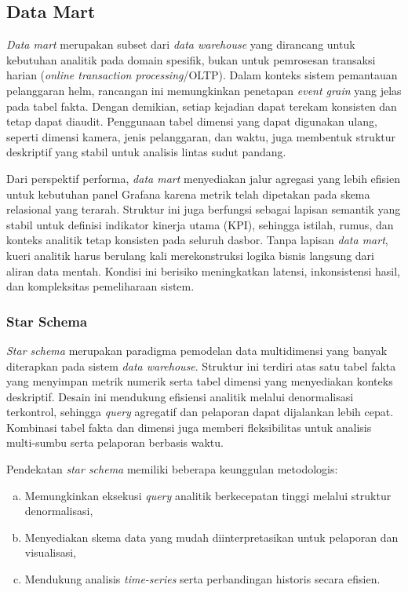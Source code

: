 \subsection{Data Mart}

\textit{Data mart} merupakan subset dari \textit{data warehouse} yang
dirancang untuk kebutuhan analitik pada domain spesifik, bukan untuk
pemrosesan transaksi harian (\textit{online transaction processing}/OLTP).
Dalam konteks sistem pemantauan pelanggaran helm, rancangan ini memungkinkan
penetapan \textit{event grain} yang jelas pada tabel fakta. Dengan demikian,
setiap kejadian dapat terekam konsisten dan tetap dapat diaudit. Penggunaan
tabel dimensi yang dapat digunakan ulang, seperti dimensi kamera, jenis
pelanggaran, dan waktu, juga membentuk struktur deskriptif yang stabil untuk
analisis lintas sudut pandang.

Dari perspektif performa, \textit{data mart} menyediakan jalur agregasi yang
lebih efisien untuk kebutuhan panel Grafana karena metrik telah dipetakan pada
skema relasional yang terarah. Struktur ini juga berfungsi sebagai lapisan
semantik yang stabil untuk definisi indikator kinerja utama (KPI), sehingga
istilah, rumus, dan konteks analitik tetap konsisten pada seluruh dasbor.
Tanpa lapisan \textit{data mart}, kueri analitik harus berulang kali
merekonstruksi logika bisnis langsung dari aliran data mentah. Kondisi ini
berisiko meningkatkan latensi, inkonsistensi hasil, dan kompleksitas
pemeliharaan sistem.

\subsubsection{Star Schema}

\textit{Star schema} merupakan paradigma pemodelan data multidimensi yang
banyak diterapkan pada sistem \textit{data warehouse}. Struktur ini terdiri
atas satu tabel fakta yang menyimpan metrik numerik serta tabel dimensi yang
menyediakan konteks deskriptif. Desain ini mendukung efisiensi analitik
melalui denormalisasi terkontrol, sehingga \textit{query} agregatif dan
pelaporan dapat dijalankan lebih cepat. Kombinasi tabel fakta dan dimensi juga
memberi fleksibilitas untuk analisis multi-sumbu serta pelaporan berbasis
waktu.

Pendekatan \textit{star schema} memiliki beberapa keunggulan metodologis:
\begin{enumerate}[a.]
\item Memungkinkan eksekusi \textit{query} analitik berkecepatan tinggi melalui struktur denormalisasi,
\item Menyediakan skema data yang mudah diinterpretasikan untuk pelaporan dan visualisasi,
\item Mendukung analisis \textit{time-series} serta perbandingan historis secara efisien.
\end{enumerate}

